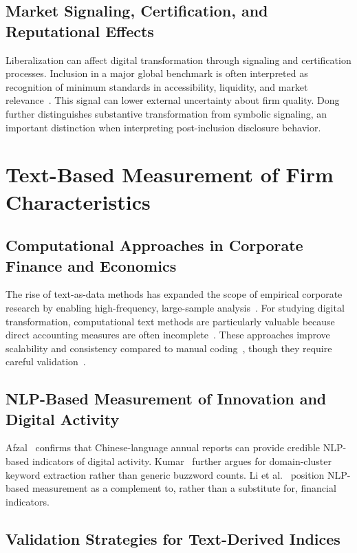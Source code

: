 \subsection{Market Signaling, Certification, and Reputational Effects}

Liberalization can affect digital transformation through signaling and certification processes. Inclusion in a major global benchmark is often interpreted as recognition of minimum standards in accessibility, liquidity, and market relevance~\cite{CLi2023}. This signal can lower external uncertainty about firm quality. Dong~\cite{Dong2023} further distinguishes substantive transformation from symbolic signaling, an important distinction when interpreting post-inclusion disclosure behavior.

\section{Text-Based Measurement of Firm Characteristics}

\subsection{Computational Approaches in Corporate Finance and Economics}

The rise of text-as-data methods has expanded the scope of empirical corporate research by enabling high-frequency, large-sample analysis~\cite{Yang2024}. For studying digital transformation, computational text methods are particularly valuable because direct accounting measures are often incomplete~\cite{Bellstam2017}. These approaches improve scalability and consistency compared to manual coding~\cite{Ahci2023}, though they require careful validation~\cite{Zimmermann2023}.

\subsection{NLP-Based Measurement of Innovation and Digital Activity}

Afzal~\cite{Afzal2024} confirms that Chinese-language annual reports can provide credible NLP-based indicators of digital activity. Kumar~\cite{Kumar2024} further argues for domain-cluster keyword extraction rather than generic buzzword counts. Li et al.~\cite{YLi2023} position NLP-based measurement as a complement to, rather than a substitute for, financial indicators.

\subsection{Validation Strategies for Text-Derived Indices}

